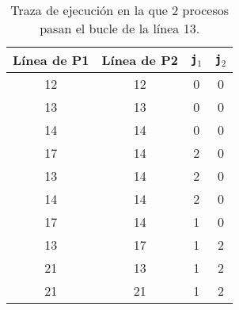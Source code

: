 \begin{ejercicio}
\begin{enumerate}[label=(\alph*)]
            \begin{table}[H]
            \centering
            \begin{tabular}{|c|c|c|c|}
                \hline
                Línea de P1 & Línea de P2 & \verb|j|$_1$ & \verb|j|$_2$ \\
                \hline
                12 & 12 & 0 & 0 \\
                \hline
                13 & 13 & 0 & 0 \\
                \hline
                14 & 14 & 0 & 0 \\
                \hline
                17 & 14 & 2 & 0 \\
                \hline
                13 & 14 & 2 & 0 \\
                \hline
                14 & 14 & 2 & 0 \\
                \hline
                17 & 14 & 1 & 0 \\
                \hline
                13 & 17 & 1 & 2 \\
                \hline
                21 & 13 & 1 & 2 \\
                \hline
                21 & 21 & 1 & 2 \\
                \hline
            \end{tabular}
            \caption{Traza de ejecución en la que 2 procesos pasan el bucle de la línea 13.}
            \label{tab:ej_10}
            \end{table}
    \end{enumerate}
\end{ejercicio}

